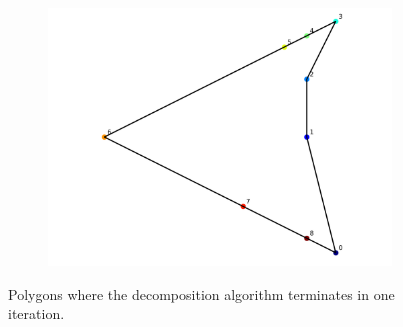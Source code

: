 \documentclass[]{article}  %
\begin{document}
\begin{figure}
\begin{subfigure}{0.6\textwidth}
  \includegraphics[width=\linewidth]{figures/iter3.png}
\end{subfigure}
\caption{Polygons where the decomposition algorithm terminates in one
iteration.}
\end{figure}
\end{document}
